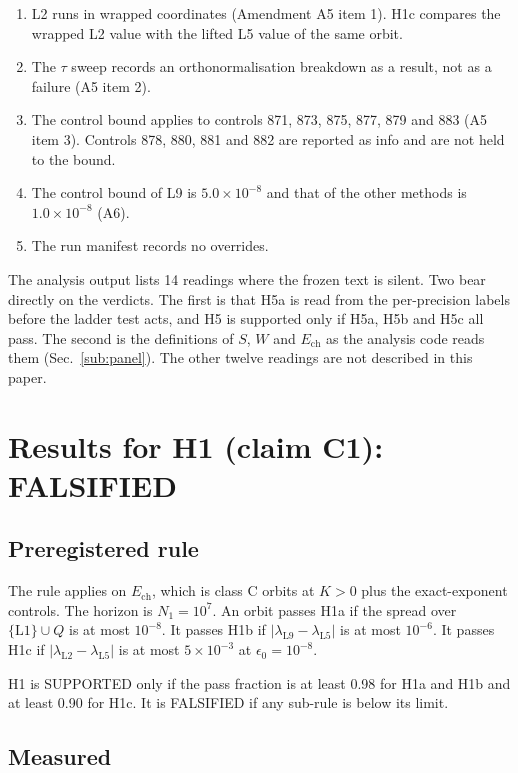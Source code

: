 \documentclass[aip,cha,reprint,amsmath,amssymb,longbibliography]{revtex4-2}
\newcommand{\sci}[2]{\ensuremath{#1\times10^{#2}}}
\newcommand{\tenp}[1]{\ensuremath{10^{#1}}}
\newcommand{\lam}[1]{\ensuremath{\lambda_{\mathrm{#1}}}}
\newcommand{\Ech}{\ensuremath{E_{\mathrm{ch}}}}
\newcommand{\Sec}[1]{Sec.~\ref{#1}}
\begin{document}
\begin{enumerate}
\item L2 runs in wrapped coordinates (Amendment A5 item 1).
H1c compares the wrapped L2 value with the lifted L5 value of the same orbit.
\item The $\tau$ sweep records an orthonormalisation breakdown as a result, not as a failure (A5 item 2).
\item The control bound applies to controls 871, 873, 875, 877, 879 and 883 (A5 item 3).
Controls 878, 880, 881 and 882 are reported as info and are not held to the bound.
\item The control bound of L9 is \sci{5.0}{-8} and that of the other methods is \sci{1.0}{-8} (A6).
\item The run manifest records no overrides.
\end{enumerate}

The analysis output lists 14 readings where the frozen text is silent.
Two bear directly on the verdicts.
The first is that H5a is read from the per-precision labels before the ladder test acts, and H5 is supported only if H5a, H5b and H5c all pass.
The second is the definitions of $S$, $W$ and $\Ech$ as the analysis code reads them (\Sec{sub:panel}).
The other twelve readings are not described in this paper.

\section{Results for H1 (claim C1): FALSIFIED}
\label{sec:h1}

\subsection{Preregistered rule}
\label{sub:h1rule}

The rule applies on $\Ech$, which is class C orbits at $K>0$ plus the exact-exponent controls.
The horizon is $N_1=$\tenp{7}.
An orbit passes H1a if the spread over $\{\mathrm{L1}\}\cup Q$ is at most \tenp{-8}.
It passes H1b if $|\lam{L9}-\lam{L5}|$ is at most \tenp{-6}.
It passes H1c if $|\lam{L2}-\lam{L5}|$ is at most \sci{5}{-3} at $\epsilon_0=$\tenp{-8}.

H1 is SUPPORTED only if the pass fraction is at least 0.98 for H1a and H1b and at least 0.90 for H1c.
It is FALSIFIED if any sub-rule is below its limit.

\subsection{Measured}
\label{sub:h1meas}
\end{document}
